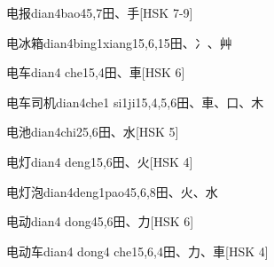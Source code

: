 \begin{EntryWithPhonetic}{电报}{dian4bao4}{5,7}{⽥、⼿}[HSK 7-9]
\end{EntryWithPhonetic}

\begin{EntryWithPhonetic}{电冰箱}{dian4bing1xiang1}{5,6,15}{⽥、⼎、⾋}
\end{EntryWithPhonetic}

\begin{EntryWithPhonetic}{电车}{dian4 che1}{5,4}{⽥、⾞}[HSK 6]
\end{EntryWithPhonetic}

\begin{EntryWithPhonetic}{电车司机}{dian4che1 si1ji1}{5,4,5,6}{⽥、⾞、⼝、⽊}
\end{EntryWithPhonetic}

\begin{EntryWithPhonetic}{电池}{dian4chi2}{5,6}{⽥、⽔}[HSK 5]
\end{EntryWithPhonetic}

\begin{EntryWithPhonetic}{电灯}{dian4 deng1}{5,6}{⽥、⽕}[HSK 4]
\end{EntryWithPhonetic}

\begin{EntryWithPhonetic}{电灯泡}{dian4deng1pao4}{5,6,8}{⽥、⽕、⽔}
\end{EntryWithPhonetic}

\begin{EntryWithPhonetic}{电动}{dian4 dong4}{5,6}{⽥、⼒}[HSK 6]
\end{EntryWithPhonetic}

\begin{EntryWithPhonetic}{电动车}{dian4 dong4 che1}{5,6,4}{⽥、⼒、⾞}[HSK 4]
\end{EntryWithPhonetic}

